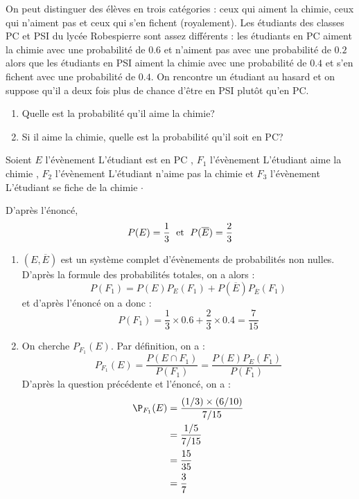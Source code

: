 \documentclass[a4paper,10pt]{report}
\begin{document}
\begin{Exa} On peut distinguer des élèves en trois catégories : ceux qui aiment la chimie, ceux qui n'aiment pas et ceux qui s'en fichent (royalement). Les étudiants des classes PC et PSI du lycée Robespierre sont assez différents : les étudiants en PC aiment la chimie avec une probabilité de $0.6$ et n'aiment pas avec une probabilité de $0.2$ alors que les étudiants en PSI aiment la chimie avec une probabilité de $0.4$ et s'en fichent avec une probabilité de $0.4$. On rencontre un étudiant au hasard et on suppose qu'il a deux fois plus de chance d'être en PSI plutôt qu'en PC.

\begin{enumerate}
\item Quelle est la probabilité qu'il aime la chimie?
\item Si il aime la chimie, quelle est la probabilité qu'il soit en PC?
\end{enumerate}
\end{Exa}

\corr Soient $E$ l'évènement \og L'étudiant est en PC \fg , $F_1$ l'évènement \og L'étudiant aime la chimie \fg , $F_2$ l'évènement \og L'étudiant n'aime pas la chimie \fg et $F_3$ l'évènement \og L'étudiant se fiche de la chimie \fg $\cdot$

\medskip

\noindent D'après l'énoncé,
$$ P(E) = \dfrac{1}{3} \; \hbox{ et } \; P(\overline{E}) = \dfrac{2}{3}$$
\begin{enumerate}
\item $(E, \overline{E})$ est un système complet d'évènements de probabilités non nulles. D'après la formule des probabilités totales, on a alors :
\[ P(F_1) = P(E) P_E(F_1) + P(\overline{E})P_{\overline{E}}(F_1) \]
et d'après l'énoncé on a donc :
\[ P(F_1) = \dfrac{1}{3} \times 0.6 + \dfrac{2}{3} \times 0.4 = \dfrac{7}{15} \]
\item On cherche $P_{F_1}(E)$. Par définition, on a :
\[ P_{F_1}(E) = \frac{P(E \cap F_1)}{P(F_1)} = \frac{P(E) P_E(F_1)}{P(F_1)} \]
D'après la question précédente et l'énoncé, on a :
\begin{align*}
\P_{F_1}(E) & = \frac{(1/3) \times (6/10)}{7/15} \\
& = \dfrac{1/5}{7/15} \\
& = \dfrac{15}{35} \\
& = \dfrac{3}{7}
\end{align*}
\end{enumerate}
\end{document}
